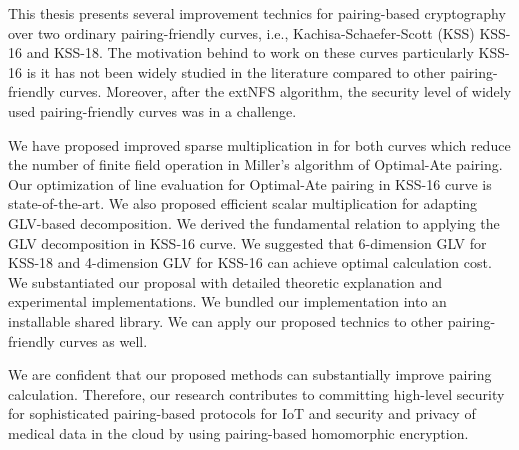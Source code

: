 This thesis presents several improvement technics for pairing-based cryptography over two ordinary pairing-friendly curves, i.e., Kachisa-Schaefer-Scott (KSS) KSS-16 and KSS-18.
The motivation behind to work on these curves particularly KSS-16 is it has not been widely studied in the literature compared to other pairing-friendly curves.
Moreover, after the extNFS algorithm, the security level of widely used pairing-friendly curves was in a challenge.

We have proposed improved sparse multiplication in for both curves which reduce the number of finite field operation in Miller's algorithm of Optimal-Ate pairing.
Our optimization of line evaluation for Optimal-Ate pairing in KSS-16 curve is state-of-the-art.
We also proposed efficient scalar multiplication for adapting GLV-based decomposition.
We derived the fundamental relation to applying the GLV decomposition in KSS-16 curve.
We suggested that 6-dimension GLV for KSS-18 and 4-dimension GLV for KSS-16 can achieve optimal calculation cost.
We substantiated our proposal with detailed theoretic explanation and experimental implementations.
We bundled our implementation into an installable shared library. 
We can apply our proposed technics to other pairing-friendly curves as well.

We are confident that our proposed methods can substantially improve pairing calculation. Therefore, our research contributes to committing high-level security for sophisticated pairing-based protocols for IoT and security and privacy of medical data in the cloud by using pairing-based homomorphic encryption.
